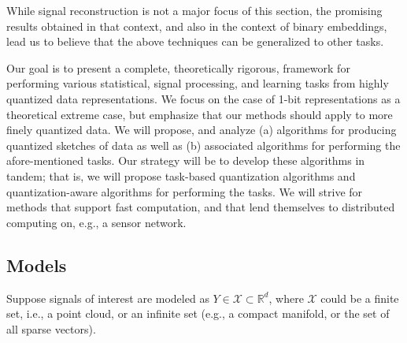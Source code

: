 While signal reconstruction is not a major focus of this section, the promising results obtained in that context, and also in the context of binary embeddings, lead us to believe that the above techniques can be generalized to other tasks. 


 Our goal  is to present a complete, theoretically rigorous, framework for performing various statistical, signal processing, and learning tasks from highly quantized data representations. We focus on the case of 1-bit representations as a theoretical extreme case, but emphasize that our methods should apply to more finely quantized data. We will propose, and analyze  (a) algorithms for  producing quantized sketches of data as well as (b) associated algorithms for performing the afore-mentioned tasks. Our strategy will be to develop these algorithms in tandem; that is, we will propose task-based quantization algorithms and quantization-aware algorithms for performing the tasks. We will strive for methods that support fast computation, and that lend themselves to distributed computing on, e.g., a sensor network.

\subsection{Models}
  
Suppose signals of interest are modeled as $Y\in \mathcal{X} \subset
\mathbb{R}^d$, where $\mathcal{X}$ could be a finite set, i.e., a
point cloud, or an infinite set (e.g., a compact manifold, or the set
of all sparse vectors).

